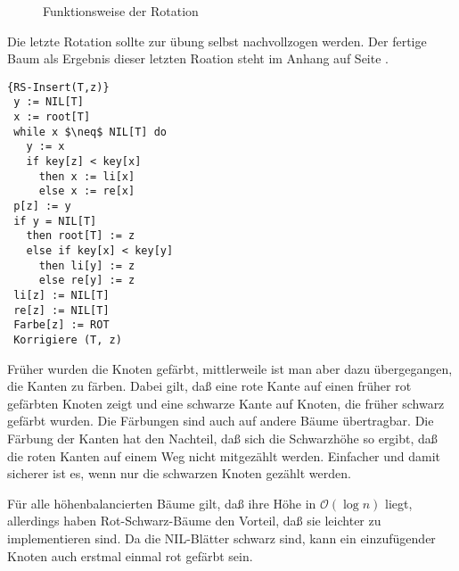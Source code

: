 \documentclass[ngerman,draft,parskip=half*,twoside]{scrreprt}
\theoremstyle{break}
\theoremstyle{nonumberbreak}
\newcommand*{\OO}{\mathcal{O}}      %
\begin{document}
\begin{figure}[H]
\centering
\hspace{5mm}

\caption{Funktionsweise der Rotation}
\end{figure}
Die letzte Rotation sollte zur übung selbst nachvollzogen werden. Der fertige Baum als Ergebnis dieser letzten Roation steht im Anhang
auf Seite \pageref{rsrotation}.

\begin{Algorithmus}[H]
\begin{lstlisting}[frame=tlrb, mathescape=true, title=\textsc{RS-Insert\textnormal{(T, z)}}, gobble=1]{RS-Insert(T,z)}
 y := NIL[T]
 x := root[T]
 while x $\neq$ NIL[T] do
   y := x
   if key[z] < key[x]
     then x := li[x]
     else x := re[x]
 p[z] := y
 if y = NIL[T]
   then root[T] := z
   else if key[x] < key[y]
     then li[y] := z
     else re[y] := z
 li[z] := NIL[T]
 re[z] := NIL[T]
 Farbe[z] := ROT
 Korrigiere (T, z)
\end{lstlisting}
\end{Algorithmus}

Früher wurden die Knoten gefärbt, mittlerweile ist man aber dazu übergegangen, die Kanten zu färben. Dabei gilt, daß eine rote
Kante auf einen früher rot gefärbten Knoten zeigt und eine schwarze Kante auf Knoten, die früher schwarz gefärbt
wurden. Die Färbungen sind auch auf andere Bäume übertragbar. Die Färbung der Kanten hat den Nachteil, daß sich die Schwarzhöhe so
ergibt, daß die roten Kanten auf einem Weg nicht mitgezählt werden. Einfacher und damit sicherer ist es, wenn nur die schwarzen Knoten
gezählt werden.

Für alle höhenbalancierten Bäume gilt, daß ihre Höhe in $\OO(\log n)$ liegt, allerdings haben Rot-Schwarz-Bäume den Vorteil, daß
sie leichter zu implementieren sind. Da die NIL-Blätter schwarz sind, kann ein einzufügender Knoten auch erstmal einmal rot gefärbt
sein.

\end{document}
